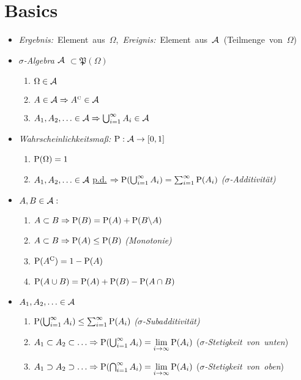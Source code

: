 \section{Basics}

\begin{itemize}
\item \mbox{\textit{Ergebnis:} Element aus $\Omega$, 
\textit{Ereignis: } Element aus $\A$ (Teilmenge von $\Omega$)}

\item \textit{$\sigma$-Algebra $\A$} $\subset\mathfrak{P}(\Omega)$
	\begin{enumerate}
	\item $\Omega\in\A$
	\item $A\in\A \Rightarrow \compl{A}\in\A$
	\item $A_1, A_2,\ldots\in\A \Rightarrow \bigcup_{i=1}^{\infty} A_i \in\A$
	\end{enumerate}
	
\item \textit{Wahrscheinlichkeitsmaß:} $\P:\A\rightarrow [0,1]$
	\begin{enumerate}
	\item $\P(\Omega)=1$
	\item $A_1,A_2,\ldots\in\A$ \underline{p.d.} 
	$\Rightarrow \P(\bigcup_{i=1}^{\infty} A_i)
	= \sum_{i=1}^{\infty}\P(A_i)$ \hfill\textit{($\sigma$-Additivität)}
	\end{enumerate}

\item $A,B\in\A:$
	\begin{enumerate}
	\item $A\subset B \Rightarrow \P(B)=\P(A)+\P(B\backslash A)$
	\item $A\subset B \Rightarrow \P(A)\leq\P(B)$
	\hfill\textit{(Monotonie)}
	\item $\P(A^{\text{C}})=1-\P(A)$
	\item $\P(A\cup B) = \P(A)+\P(B)-\P(A\cap B)$
	\end{enumerate}
	
\item $A_1,A_2,\ldots\in\A$
	\begin{enumerate}
	\item $\P(\bigcup_{i=1}^{\infty} A_i)\leq\sum_{i=1}^{\infty} \P(A_i)$ 
	\hfill\textit{($\sigma$-Subadditivität)}
	\item $A_1\subset A_2\subset\ldots \Rightarrow 
	\P(\bigcup_{i=1}^{\infty} A_i)=\lim\limits_{i\to\infty} \P(A_i)$
	\hfill\mbox{(\textit{$\sigma$-Stetigkeit von unten})}
	\item $A_1 \supset A_2\supset\ldots \Rightarrow
	\P(\bigcap_{i=1}^{\infty} A_i)=\lim\limits_{i\to\infty} \P(A_i)$
	\hfill\mbox{(\textit{$\sigma$-Stetigkeit von oben})}
	\end{enumerate}


\end{itemize}
